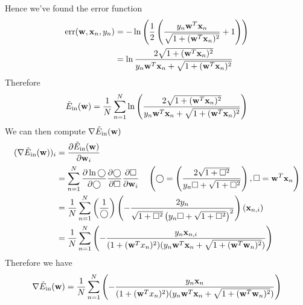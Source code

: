 \documentclass[11pt]{article}
\theoremstyle{definition}
\begin{document}
Hence we've found the error function 
\begin{align*}
  \text{err}(\vb{w}, \vb{x}_n, y_n) &= -\ln \left(\frac{1}{2}\left(\frac{y_n\vb{w}^T\vb{x}_n}{\sqrt{1 + (\vb{w}^T\vb{x}_n)^2}} + 1\right)\right) \\ 
  &= \ln \frac{2\sqrt{1 + (\vb{w}^T\vb{x}_n)^2}}{y_n\vb{w}^T\vb{x}_n + \sqrt{1 + (\vb{w}^T\vb{x}_n)^2}}
\end{align*}
Therefore 
\[
  \tilde{E}_{\text{in}}(\vb{w}) = \frac{1}{N}\sum_{n=1}^{N}\ln\left( \frac{2\sqrt{1 + (\vb{w}^T\vb{x}_n)^2}}{y_n\vb{w}^T\vb{x}_n + \sqrt{1 + (\vb{w}^T\vb{x}_n)^2}}\right)
\]
We can then compute $\nabla\tilde{E}_{\text{in}}(\vb{w})$
\begin{align*}
  (\nabla\tilde{E}_{\text{in}}(\vb{w}))_i &= \pdv{\tilde{E}_{\text{in}}(\vb{w})}{\vb{w}_i} \\ 
  &= \sum_{n=1}^N \pdv{\ln \bigcirc}{\bigcirc}\pdv{\bigcirc}{\square}\pdv{\square}{\vb{w}_i}\quad \left(\bigcirc = \left( \frac{2\sqrt{1 + \square^2}}{y_n\square + \sqrt{1 + \square^2}}\right), \square = \vb{w}^T\vb{x}_n\right) \\
  &= \frac{1}{N}\sum_{n=1}^N \left(\frac{1}{\bigcirc}\right)\left(-\frac{2y_n}{\sqrt{1 + \square^2}\left(y_n\square + \sqrt{1 + \square^2}\right)^2}\right)\left(\vb{x}_{n,i}\right) \\
  &= \frac{1}{N}\sum_{n=1}^N\left(-\frac{y_n\vb{x}_{n, i}}{(1 + (\vb{w}^T{x}_n)^2)(y_n\vb{w}^T\vb{x}_n + \sqrt{1 + (\vb{w}^T\vb{w}_n)^2})}\right)
\end{align*}
Therefore we have
\[
  \nabla\tilde{E}_{\text{in}}(\vb{w}) = \frac{1}{N}\sum_{n=1}^N\left(-\frac{y_n\vb{x}_{n}}{(1 + (\vb{w}^T{x}_n)^2)(y_n\vb{w}^T\vb{x}_n + \sqrt{1 + (\vb{w}^T\vb{w}_n)^2})}\right)
\]



\newpage
\end{document}

